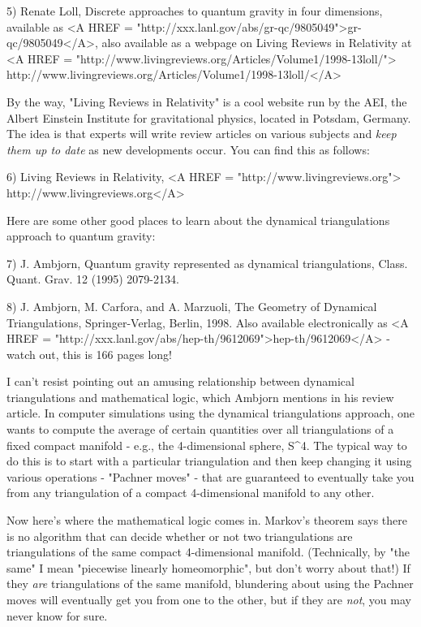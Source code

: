 5) Renate Loll, Discrete approaches to quantum gravity in four dimensions,
available as 
<A HREF = "http://xxx.lanl.gov/abs/gr-qc/9805049">gr-qc/9805049</A>,
also available as a webpage on Living Reviews in Relativity at
<A HREF = "http://www.livingreviews.org/Articles/Volume1/1998-13loll/">
http://www.livingreviews.org/Articles/Volume1/1998-13loll/</A>

By the way, "Living Reviews in Relativity" is a cool website run by
the AEI, the Albert Einstein Institute for gravitational physics,
located in Potsdam, Germany.  The idea is that experts will write
review articles on various subjects and \emph{keep them up to date} as new
developments occur.  You can find this as follows:

6) Living Reviews in Relativity, <A HREF = "http://www.livingreviews.org">
http://www.livingreviews.org</A>

Here are some other good places to learn about the dynamical triangulations
approach to quantum gravity:

7) J. Ambjorn, Quantum gravity represented as dynamical triangulations,
Class. Quant. Grav. 12 (1995) 2079-2134.

8) J. Ambjorn, M. Carfora, and A. Marzuoli, The Geometry of Dynamical
Triangulations, Springer-Verlag, Berlin, 1998.  Also available
electronically as <A HREF =
"http://xxx.lanl.gov/abs/hep-th/9612069">hep-th/9612069</A> - watch out,
this is 166 pages long!

I can't resist pointing out an amusing relationship between dynamical
triangulations and mathematical logic, which Ambjorn mentions in his
review article.  In computer simulations using the dynamical triangulations
approach, one wants to compute the average of certain quantities over all
triangulations of a fixed compact manifold - e.g., the 4-dimensional sphere, 
S^{4}.  The typical way to do this is to start with a particular triangulation
and then keep changing it using various operations - "Pachner moves" - 
that are guaranteed to eventually take you from any triangulation of a
compact 4-dimensional manifold to any other.  

Now here's where the mathematical logic comes in.  Markov's theorem says
there is no algorithm that can decide whether or not two triangulations
are triangulations of the same compact 4-dimensional manifold.
(Technically, by "the same" I mean "piecewise linearly
homeomorphic", but don't worry about that!)  If they \emph{are}
triangulations of the same manifold, blundering about using the Pachner
moves will eventually get you from one to the other, but if they are
\emph{not}, you may never know for sure.


